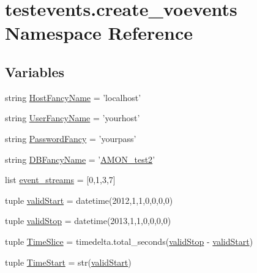 \hypertarget{namespacetestevents_1_1create__voevents}{\section{testevents.\-create\-\_\-voevents Namespace Reference}
\label{namespacetestevents_1_1create__voevents}
}
\subsection*{Variables}
\begin{DoxyCompactItemize}
\item 
string \hyperlink{namespacetestevents_1_1create__voevents_ac3b88f58e63db0a1c376d21566b8e8f9}{Host\-Fancy\-Name} = 'localhost'
\item 
string \hyperlink{namespacetestevents_1_1create__voevents_ac24452ad8ddb38fa85ee46742e8ea754}{User\-Fancy\-Name} = 'yourhost'
\item 
string \hyperlink{namespacetestevents_1_1create__voevents_a2db4ec9f725eb156b3fa3d86e0a10ba0}{Password\-Fancy} = 'yourpass'
\item 
string \hyperlink{namespacetestevents_1_1create__voevents_afa107656f14779d5495d5591960e5fdf}{D\-B\-Fancy\-Name} = '\hyperlink{db__mc__build_8sql_a19c21c59303d8b6591b92240ff7de1d5}{A\-M\-O\-N\-\_\-test2}'
\item 
list \hyperlink{namespacetestevents_1_1create__voevents_a616c13718ef9e11dffec25cdea829347}{event\-\_\-streams} = \mbox{[}0,1,3,7\mbox{]}
\item 
tuple \hyperlink{namespacetestevents_1_1create__voevents_a9ea0cae1b844a0d1b5ff6fae78565167}{valid\-Start} = datetime(2012,1,1,0,0,0,0)
\item 
tuple \hyperlink{namespacetestevents_1_1create__voevents_a80fe94b0ac338bc706910bebac4132aa}{valid\-Stop} = datetime(2013,1,1,0,0,0,0)
\item 
tuple \hyperlink{namespacetestevents_1_1create__voevents_aa05646e11a377bb3c5550b25e37ed4fa}{Time\-Slice} = timedelta.\-total\-\_\-seconds(\hyperlink{namespacetestevents_1_1create__voevents_a80fe94b0ac338bc706910bebac4132aa}{valid\-Stop} -\/ \hyperlink{namespacetestevents_1_1create__voevents_a9ea0cae1b844a0d1b5ff6fae78565167}{valid\-Start})
\item 
tuple \hyperlink{namespacetestevents_1_1create__voevents_abd84c25fbf80dd061bed62068efa42b7}{Time\-Start} = str(\hyperlink{namespacetestevents_1_1create__voevents_a9ea0cae1b844a0d1b5ff6fae78565167}{valid\-Start})

\end{DoxyCompactItemize}
